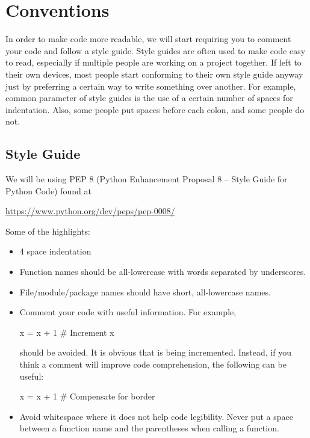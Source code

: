 \documentclass[11pt]{cselabheader}
\begin{document}
{\pagebreak
\section{Conventions}
\label{sec:pep8}

In order to make code more readable, we will start requiring you to comment your
code and follow a style guide. Style guides are often used to make code easy to
read, especially if multiple people are working on a project together. If left
to their own devices, most people start conforming to their own style guide
anyway just by preferring a certain way to write something over another. For
example, common parameter of style guides is the use of a certain number of
spaces for indentation. Also, some people put spaces before each colon, and some
people do not.

\subsection{Style Guide}

We will be using PEP 8 (Python Enhancement Proposal 8 -- Style Guide for Python
Code) found at
\begin{center}
  \url{https://www.python.org/dev/peps/pep-0008/}
\end{center}

Some of the highlights:
\begin{itemize}
  \item 4 space indentation
  \item Function names should be all-lowercase with words separated by underscores.
  \item File/module/package names should have short, all-lowercase names.
  \item Comment your code with useful information. For example,

    \begin{python3code}
x = x + 1 # Increment x
    \end{python3code}

    should be avoided. It is obvious that  is being incremented.
    Instead, if you think a comment will improve code comprehension, the
    following can be useful:

    \begin{python3code}
x = x + 1 # Compensate for border
    \end{python3code}

  \item Avoid whitespace where it does not help code legibility. Never put a
    space between a function name and the parentheses when calling a function.


\end{itemize}}
\end{document}
